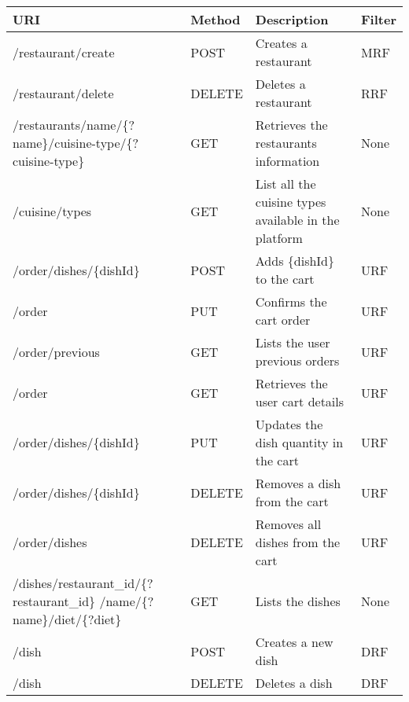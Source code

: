 \begin{longtable}{|p{}|p{} |p{}|p{}|} 
\hline
\textbf{URI} & \textbf{Method} & \textbf{Description} & \textbf{Filter} \\\hline

/restaurant/create & POST &  Creates a restaurant & MRF\\\hline


/restaurant/delete & DELETE &  Deletes a restaurant & RRF\\\hline

/restaurants/name/\{?name\}/cuisine-type/\{?cuisine-type\} & GET &  Retrieves the restaurants information & None\\\hline

/cuisine/types & GET &  List all the cuisine types available in the platform & None\\\hline

/order/dishes/\{dishId\} & POST &  Adds \{dishId\} to the cart & URF\\\hline

/order & PUT &  Confirms the cart order & URF\\\hline

/order/previous & GET &  Lists the user previous orders & URF\\\hline

/order & GET & Retrieves the user cart details & URF\\\hline

/order/dishes/\{dishId\} & PUT & Updates the dish quantity in the cart & URF\\\hline

/order/dishes/\{dishId\} & DELETE & Removes a dish from the cart & URF\\\hline

/order/dishes & DELETE & Removes all dishes from the cart & URF\\\hline

/dishes/restaurant\_id/\{?restaurant\_id\} /name/\{?name\}/diet/\{?diet\} & GET & Lists the dishes & None\\\hline

/dish & POST & Creates a new dish & DRF\\\hline

/dish & DELETE & Deletes a dish & DRF\\\hline


\end{longtable}
